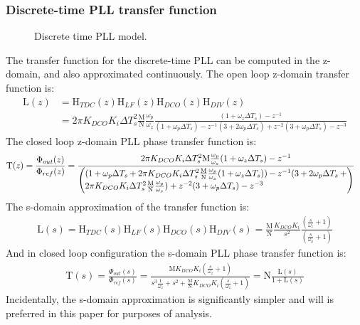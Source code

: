 	\subsubsection{Discrete-time PLL transfer function}
		\begin{figure}[htb!]
			\center
			\caption{Discrete time PLL model.}
			\label{fig:discrete_pll2}
		\end{figure}
		\FloatBarrier
		The transfer function for the discrete-time PLL can be computed in the z-domain, and also approximated continuously. The open loop z-domain transfer function is:
		\begin{align}
			\mathrm{L}(z) &= \mathrm{H}_{TDC}(z)\mathrm{H}_{LF}(z)\mathrm{H}_{DCO}(z)\mathrm{H}_{DIV}(z) \\
			&= 2\pi K_{DCO}K_i\Delta T_s^2\frac{\mathrm{M}}{\mathrm{N}}\frac{\omega_p}{\omega_z}\frac{(1+\omega_z\Delta T_s)-z^{-1}}{(1+\omega_p\Delta T_s) - z^{-1}(3+2\omega_p\Delta T_s) + z^{-2}(3+\omega_p\Delta T_s) - z^{-3}}\label{eq:z_open_loop}
		\end{align}
		The closed loop z-domain PLL phase transfer function is:
		\begin{align}
			\mathrm{T}(z) = \frac{\Phi_{out}(z)}{\Phi_{ref}(z)} &= \frac{2\pi K_{DCO}K_i\Delta T_s^2\mathrm{M}\frac{\omega_p}{\omega_z}(1+\omega_z\Delta T_s)-z^{-1}}{\left(\parbox{4.2in}{$(1+\omega_p\Delta T_s + 2\pi K_{DCO}K_i\Delta T_s^2\frac{\mathrm{M}}{\mathrm{N}}\frac{\omega_p}{\omega_z}(1+\omega_z\Delta T_s))- z^{-1}(3+2\omega_p\Delta T_s+2\pi K_{DCO}K_i\Delta T_s^2\frac{\mathrm{M}}{\mathrm{N}}\frac{\omega_p}{\omega_z})+ z^{-2}(3+\omega_p\Delta T_s) - z^{-3}$}\right)}%
		\end{align}
		The s-domain approximation of the transfer function is:
		\begin{align}
			\mathrm{L}(s) = \mathrm{H}_{TDC}(s)\mathrm{H}_{LF}(s)\mathrm{H}_{DCO}(s)\mathrm{H}_{DIV}(s) = \frac{\mathrm{M}}{\mathrm{N}}\frac{K_{DCO}K_i}{s^2} \frac{\left(\frac{s}{\omega_z} + 1\right)}{\left(\frac{s}{\omega_p} + 1\right)}
		\end{align}
		And in closed loop configuration the s-domain PLL phase transfer function is:
		\begin{align}
			\mathrm{T}(s)=\frac{\Phi_{out}(s)}{\Phi_{ref}(s)} = \frac{\mathrm{M}K_{DCO}K_i\left(\frac{s}{\omega_z} + 1\right)}{s^3\frac{1}{\omega_z} + s^2 + \frac{\mathrm{M}}{\mathrm{N}}K_{DCO}K_i\left(\frac{s}{\omega_z} + 1\right)} = \mathrm{N}\frac{\mathrm{L}(s)}{1+\mathrm{L}(s)}
		\end{align}
		Incidentally, the s-domain approximation is significantly simpler and will is preferred in this paper for purposes of analysis.

